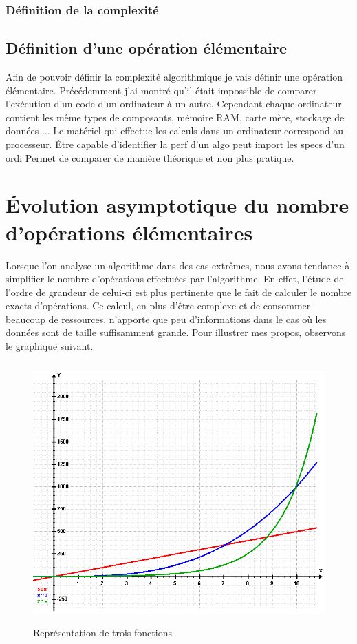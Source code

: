 \documentclass[12pt, twoside, openright]{report}
\begin{document}
\subsubsection{Définition de la complexité }

\subsection{Définition d'une opération élémentaire} %

Afin de pouvoir définir la complexité algorithmique je vais définir une opération élémentaire. Précédemment j'ai montré qu'il était impossible de comparer l'exécution d'un code d'un ordinateur à un autre. Cependant chaque ordinateur contient les même types de composants, mémoire RAM, carte mère, stockage de données ... Le matériel qui effectue les calculs dans un ordinateur correspond au processeur.  
Être capable d'identifier la perf d'un algo peut import les specs d'un ordi
Permet de comparer de manière théorique et non plus pratique.

\section{Évolution asymptotique du nombre d'opérations élémentaires}

Lorsque l'on analyse un algorithme dans des cas extrêmes, nous avons tendance à simplifier le nombre d'opérations effectuées par l'algorithme. En effet, l'étude de l'ordre de grandeur de celui-ci est plus pertinente que le fait de calculer le nombre exacts d'opérations. Ce calcul, en plus d'être complexe et de consommer beaucoup de ressources, n'apporte que peu d'informations dans le cas où les données sont de taille suffisamment grande. Pour illustrer mes propos, observons le graphique suivant.

\begin{figure}[H]
    \centering
    \includegraphics[height=10cm,width=14cm]{Complexite/Exponential.png}
    \caption{Représentation de trois fonctions}
    \label{fig:my_label}
\end{figure}
\end{document}
